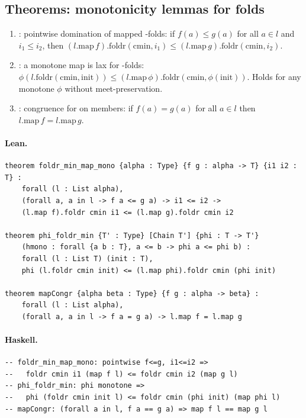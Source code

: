 \documentclass[11pt,a4paper]{article}
\begin{document}
\subsection{Theorems: monotonicity lemmas for folds}

\begin{thm}
\begin{enumerate}
\item \textbf{}: pointwise domination of mapped
  -folds: if $f(a) \le g(a)$ for all $a \in l$ and $i_1 \le i_2$,
  then $(l.\mathrm{map}\,f).\mathrm{foldr}(\mathrm{cmin}, i_1) \le
  (l.\mathrm{map}\,g).\mathrm{foldr}(\mathrm{cmin}, i_2)$.

\item \textbf{}: a monotone map is lax for
  -folds:
  $\phi(l.\mathrm{foldr}(\mathrm{cmin}, \mathrm{init})) \le
  (l.\mathrm{map}\,\phi).\mathrm{foldr}(\mathrm{cmin}, \phi(\mathrm{init}))$.
  Holds for any monotone $\phi$ without meet-preservation.

\item \textbf{}: congruence for  on members:
  if $f(a) = g(a)$ for all $a \in l$ then $l.\mathrm{map}\,f = l.\mathrm{map}\,g$.
\end{enumerate}
\end{thm}

\paragraph{Lean.}
\begin{lstlisting}[style=lean]
theorem foldr_min_map_mono {alpha : Type} {f g : alpha -> T} {i1 i2 : T} :
    forall (l : List alpha),
    (forall a, a in l -> f a <= g a) -> i1 <= i2 ->
    (l.map f).foldr cmin i1 <= (l.map g).foldr cmin i2

theorem phi_foldr_min {T' : Type} [Chain T'] {phi : T -> T'}
    (hmono : forall {a b : T}, a <= b -> phi a <= phi b) :
    forall (l : List T) (init : T),
    phi (l.foldr cmin init) <= (l.map phi).foldr cmin (phi init)

theorem mapCongr {alpha beta : Type} {f g : alpha -> beta} :
    forall (l : List alpha),
    (forall a, a in l -> f a = g a) -> l.map f = l.map g
\end{lstlisting}

\paragraph{Haskell.}
\begin{lstlisting}[style=haskell]
-- foldr_min_map_mono: pointwise f<=g, i1<=i2 =>
--   foldr cmin i1 (map f l) <= foldr cmin i2 (map g l)
-- phi_foldr_min: phi monotone =>
--   phi (foldr cmin init l) <= foldr cmin (phi init) (map phi l)
-- mapCongr: (forall a in l, f a == g a) => map f l == map g l
\end{lstlisting}
\end{document}
